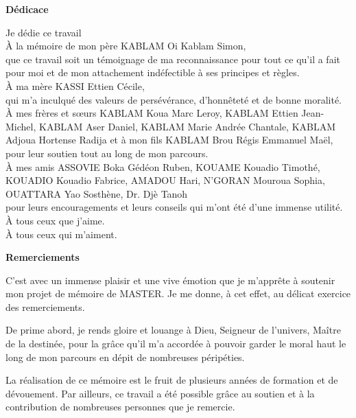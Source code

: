 \begin{center}
	\LARGE{\textbf{Dédicace}}
\end{center}

\begin{center}
	Je dédie ce travail\\
	\uppercase{à} la mémoire de mon père KABLAM Oi Kablam Simon, \\ que ce travail soit un témoignage de ma reconnaissance pour tout ce qu'il a fait pour moi et de mon attachement indéfectible à ses principes et règles. \\
	\uppercase{à} ma mère KASSI Ettien Cécile, \\ qui m'a inculqué des valeurs de persévérance, d'honnêteté et de bonne moralité. \\
	\uppercase{à} mes frères et sœurs KABLAM Koua Marc Leroy, KABLAM Ettien Jean-Michel, KABLAM Aser Daniel, KABLAM Marie Andrée Chantale, KABLAM Adjoua Hortense Radija et à mon fils KABLAM Brou Régis Emmanuel Maël, \\ pour leur soutien tout au long de mon parcours.\\
	\uppercase{à} mes amis ASSOVIE Boka Gédéon Ruben, KOUAME Kouadio Timothé, KOUADIO Kouadio Fabrice, AMADOU Hari, N'GORAN Mouroua Sophia, OUATTARA Yao Sosthène, Dr. Djè Tanoh\\ pour leurs encouragements et leurs conseils qui m'ont été d'une immense utilité.\\
	\uppercase{à} tous ceux que j'aime.\\
	\uppercase{à} tous ceux qui m'aiment.
	
	
\end{center} 

\newpage
{}
\begin{center}
	\LARGE{\textbf{Remerciements}}
\end{center}
C'est avec un immense plaisir et une vive émotion que je m'apprête à soutenir mon projet de mémoire de MASTER. Je me donne, à cet effet, au délicat exercice des remerciements.

De prime abord, je rends gloire et louange à Dieu, Seigneur de l'univers, Maître de la destinée, pour la grâce qu'il m'a accordée à pouvoir garder le moral haut le long de mon parcours en dépit de nombreuses péripéties.

La réalisation de ce mémoire est le fruit de plusieurs années de formation et de dévouement. 
Par ailleurs, ce travail a été possible grâce au soutien et à la contribution de nombreuses personnes que je remercie.


